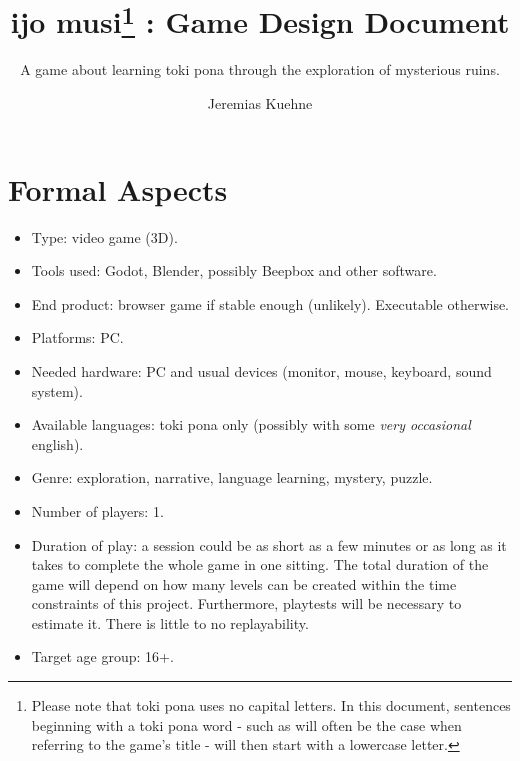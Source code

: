 \documentclass{scrartcl}
\title{ijo musi\footnote{Please note that toki pona uses no capital letters. In this document, sentences beginning with a toki pona word - such as will often be the case when referring to the game's title - will then start with a lowercase letter.} : Game Design Document}
\subtitle{A game about learning toki pona through the exploration of mysterious ruins.}
\author{Jeremias Kuehne}
\begin{document}
	
	\maketitle
	\section{Formal Aspects}
		\begin{itemize}
			\item Type: video game (3D).
			\item Tools used: Godot, Blender, possibly Beepbox and other software.
			\item End product: browser game if stable enough (unlikely). Executable otherwise.
			\item Platforms: PC.
			\item Needed hardware: PC and usual devices (monitor, mouse, keyboard, sound system).
			\item Available languages: toki pona only (possibly with some \textit{very occasional} english).
			\item Genre: exploration, narrative, language learning, mystery, puzzle.
			\item Number of players: 1.
			\item Duration of play: a session could be as short as a few minutes or as long as it takes to complete the whole game in one sitting. The total duration of the game will depend on how many levels can be created within the time constraints of this project. Furthermore, playtests will be necessary to estimate it. There is little to no replayability.
			\item Target age group: 16+.
		\end{itemize}
\end{document}
